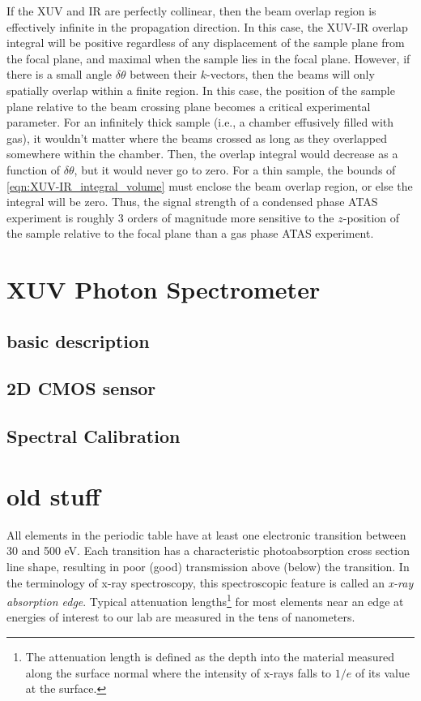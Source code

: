If the XUV and IR are perfectly collinear, then the beam overlap region is effectively infinite in the propagation direction. In this case, the XUV-IR overlap integral will be positive regardless of any displacement of the sample plane from the focal plane, and maximal when the sample lies in the focal plane. However, if there is a small angle $\delta \theta$ between their $k$-vectors, then the beams will only spatially overlap within a finite region. In this case, the position of the sample plane relative to the beam crossing plane becomes a critical experimental parameter. For an infinitely thick sample (i.e., a chamber effusively filled with gas), it wouldn't matter where the beams crossed as long as they overlapped somewhere within the chamber. Then, the overlap integral would decrease as a function of $\delta \theta$, but it would never go to zero. For a thin sample, the bounds of \cref{eqn:XUV-IR_integral_volume} must enclose the beam overlap region, or else the integral will be zero. Thus, the signal strength of a condensed phase ATAS experiment is roughly 3 orders of magnitude more sensitive to the $z$-position of the sample relative to the focal plane than a gas phase ATAS experiment.


\section{XUV Photon Spectrometer}

\subsection{basic description}

\subsection{2D CMOS sensor}

\subsection{Spectral Calibration}

\section{old stuff}


All elements in the periodic table have at least one electronic transition between 30 and 500 eV. Each transition has a characteristic photoabsorption cross section line shape, resulting in poor (good) transmission above (below) the transition. In the terminology of x-ray spectroscopy, this spectroscopic feature is called an \textit{x-ray absorption edge}. Typical attenuation lengths\footnote{The attenuation length is defined as the depth into the material measured along the surface normal where the intensity of x-rays falls to $1/e$ of its value at the surface.} for most elements near an edge at energies of interest to our lab are measured in the tens of nanometers.


